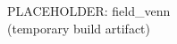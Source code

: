 \documentclass{article}
\begin{document}
\thispagestyle{empty}
\centering
\vspace*{2cm}
\Large PLACEHOLDER: field\_venn\\[1ex]
\normalsize (temporary build artifact)
\end{document}
